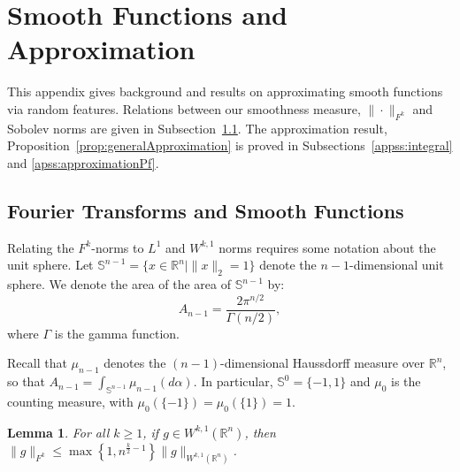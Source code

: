 \documentclass[twoside]{article}
\newtheorem{lemma}{Lemma}
\theoremstyle{definition}
\newcommand{\R}{\mathbb{R}}
\renewcommand{\S}{\mathbb{S}}
\newcommand{\1}[1]{\scalebox{1.25}{$\mathds{1}$}\left[#1\right]}
\begin{document}
\section{Smooth Functions and Approximation}
\label{app:approximation}

This appendix gives background and results on approximating smooth functions via random features. Relations between our smoothness measure, $\|\cdot\|_{F^k}$ and Sobolev norms are given in Subsection~\ref{appss:smoothness}. The approximation result, Proposition~\ref{prop:generalApproximation} is proved in Subsections~\ref{appss:integral} and \ref{apss:approximationPf}.

\subsection{Fourier Transforms and Smooth Functions}
\label{appss:smoothness}


Relating the $F^k$-norms to $L^1$ and $W^{k,1}$ norms requires some notation about the  unit sphere. 
Let $\S^{n-1}=\{x\in\R^n|\|x\|_2=1\}$ denote the $n-1$-dimensional unit sphere.
We denote the area of the area of $\S^{n-1}$ by:
\begin{equation*}
  A_{n-1} = \frac{2\pi^{n/2}}{\Gamma(n/2)},
\end{equation*}
where $\Gamma$  is the gamma function. 

Recall that $\mu_{n-1}$ denotes the $(n-1)$-dimensional Haussdorff measure over $\R^n$, so that $A_{n-1}=\int_{\S^{n-1}}\mu_{n-1}(d\alpha)$. In particular, $\S^{0}=\{-1,1\}$ and $\mu_{0}$ is the counting measure, with $\mu_{0}(\{-1\})=\mu_{0}(\{1\})=1$. 


\begin{lemma}
\label{lem:sobolevBound}
For all $k\ge 1$, if $g\in W^{k,1}(\R^n)$, then
$\|g\|_{F^k}\le \max\left\{1,n^{\frac{k}{2}-1} \right\}\|g\|_{W^{k,1}(\R^n)}$.
\end{lemma}
\end{document}

